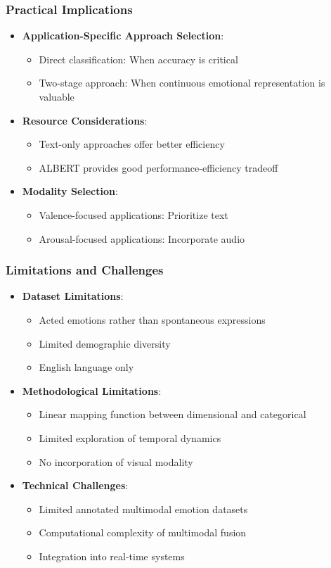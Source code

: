 \begin{frame}
\frametitle{Practical Implications}
\begin{itemize}
    \item \textbf{Application-Specific Approach Selection}:
    \begin{itemize}
        \item Direct classification: When accuracy is critical
        \item Two-stage approach: When continuous emotional representation is valuable
    \end{itemize}
    \item \textbf{Resource Considerations}:
    \begin{itemize}
        \item Text-only approaches offer better efficiency
        \item ALBERT provides good performance-efficiency tradeoff
    \end{itemize}
    \item \textbf{Modality Selection}:
    \begin{itemize}
        \item Valence-focused applications: Prioritize text
        \item Arousal-focused applications: Incorporate audio
    \end{itemize}
\end{itemize}
\end{frame}

\begin{frame}
\frametitle{Limitations and Challenges}
\begin{itemize}
    \item \textbf{Dataset Limitations}:
    \begin{itemize}
        \item Acted emotions rather than spontaneous expressions
        \item Limited demographic diversity
        \item English language only
    \end{itemize}
    \item \textbf{Methodological Limitations}:
    \begin{itemize}
        \item Linear mapping function between dimensional and categorical
        \item Limited exploration of temporal dynamics
        \item No incorporation of visual modality
    \end{itemize}
    \item \textbf{Technical Challenges}:
    \begin{itemize}
        \item Limited annotated multimodal emotion datasets
        \item Computational complexity of multimodal fusion
        \item Integration into real-time systems
    \end{itemize}
\end{itemize}
\end{frame}

